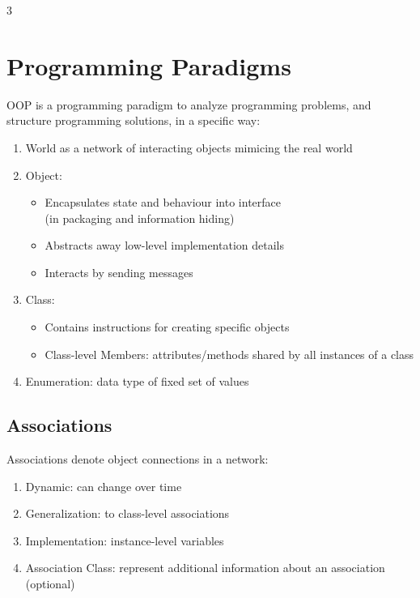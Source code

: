\documentclass[12pt, a4paper]{article}
\begin{document}
\begin{multicols*}{3}
\section{Programming Paradigms}
OOP is a programming paradigm to analyze programming problems, and structure programming solutions, in a specific way:
\begin{enumerate}[\roman*.]
  \item World as a network of interacting objects mimicing the real world 
  \item Object: 
    \begin{itemize}[leftmargin=*]\vspace{3pt}
      \item Encapsulates state and behaviour into interface\\(in packaging and information hiding) 
      \item Abstracts away low-level implementation details
      \item Interacts by sending messages
    \end{itemize}
  \item Class:
    \begin{itemize}[leftmargin=*]\vspace{3pt}
      \item Contains instructions for creating specific objects
      \item Class-level Members: attributes/methods shared by all instances of a class
    \end{itemize}
  \item Enumeration: data type of fixed set of values
\end{enumerate}
\vspace{-1em}
\colbreak 
\subsection{Associations}
Associations denote object connections in a network:
\begin{enumerate}[\roman*.]
  \item Dynamic: can change over time
  \item Generalization: to class-level associations
  \item Implementation: instance-level variables
  \item Association Class: represent additional information about an association (optional) 
\end{enumerate}


\end{multicols*}
\end{document}
